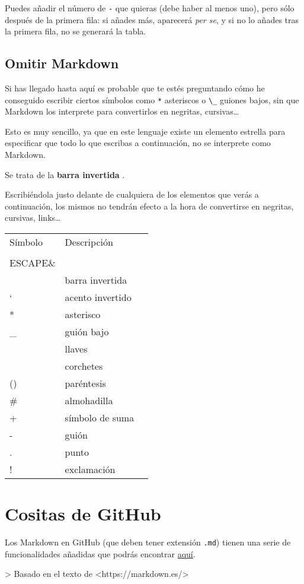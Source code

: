 Puedes añadir el número de \lstinline{-} que quieras (debe haber al menos uno), pero sólo después de la primera fila: si añades más, aparecerá \emph{per se}, y si no lo añades tras la primera fila, no se generará la tabla.

\section{Omitir Markdown}

Si has llegado hasta aquí es probable que te estés preguntando cómo he conseguido escribir ciertos símbolos como \lstinline{*} asteriscos o \lstinline{\_} guiones bajos, sin que Markdown los interprete para convertirlos en negritas, cursivas…

Esto es muy sencillo, ya que en este lenguaje existe un elemento estrella para especificar que todo lo que escribas a continuación, no se interprete como Markdown.

Se trata de la \textbf{barra invertida} \lstinline{}.

Escribiéndola justo delante de cualquiera de los elementos que verás a continuación, los mismos no tendrán efecto a la hora de convertirse en negritas, cursivas, links…

\begin{table}[]
\begin{tabular}{lll}
 Símbolo & Descripción \\              
 \\ESCAPE\&\\ & barra invertida \\
 ` & acento invertido \\
 * & asterisco \\
 \_ & guión bajo \\
 {} & llaves \\
 [] & corchetes \\
 () & paréntesis \\
 # & almohadilla \\
 + & símbolo de suma \\
 - & guión \\
 . & punto \\
 ! & exclamación \\
\end{tabular}
\end{table}

\chapter{Cositas de GitHub}

Los Markdown en GitHub (que deben tener extensión \lstinline{.md}) tienen una serie de funcionalidades añadidas que podrás encontrar \href{https://guides.github.com/features/mastering-markdown/}{aquí}.

> Basado en el texto de <https://markdown.es/>